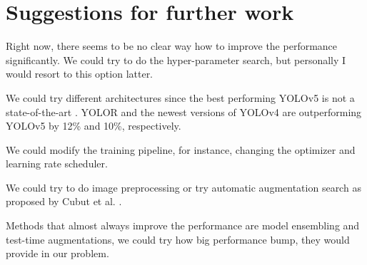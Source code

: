 \section{Suggestions for further work}
Right now, there seems to be no clear way how to improve the performance significantly. We could try to do the hyper-parameter search, but personally I would resort to this option latter.

We could try different architectures since the best performing YOLOv5 is not a state-of-the-art \cite{paperwithcode}. YOLOR and the newest versions of YOLOv4 are outperforming YOLOv5 by 12\% and 10\%, respectively.

We could modify the training pipeline, for instance, changing the optimizer and learning rate scheduler.

We could try to do image preprocessing or try automatic augmentation search as proposed by Cubut et al. \cite{Cubuk2018}.

Methods that almost always improve the performance are model ensembling and test-time augmentations, we could try how big performance bump, they would provide in our problem.